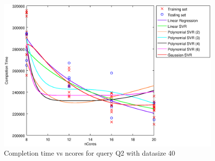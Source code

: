 
\begin {figure}[hbtp]
\centering
\includegraphics[width=\textwidth]{output/Q2_40_ONLY_1_OVER_NCORES/plot_Q2_40.eps}
\caption{Completion time vs ncores for query Q2 with datasize 40}
\label{fig:all_linear_Q2_40}
\end {figure}

